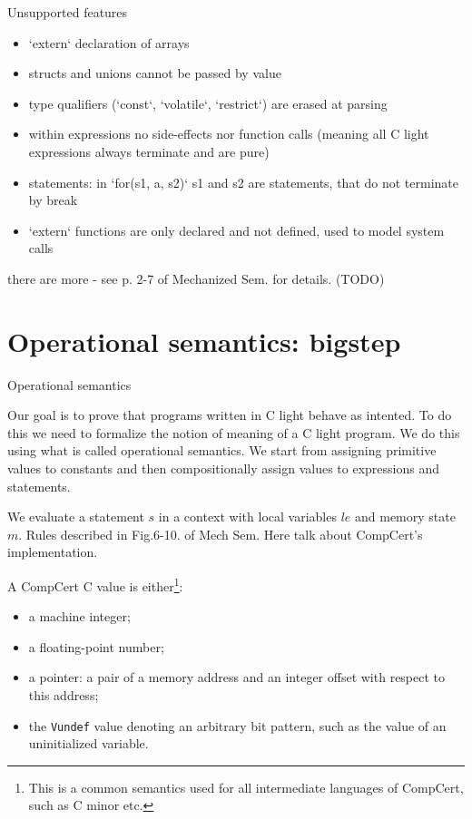 \documentclass{beamer}
\begin{document}
\begin{frame}{Unsupported features}
  \begin{itemize}
  \item `extern` declaration of arrays
\item structs and unions cannot be passed by value
\item  type qualifiers (`const`, `volatile`, `restrict`) are erased at parsing
\item within expressions no side-effects nor function calls (meaning all C light expressions always terminate and are pure)
\item statements: in `for(s1, a, s2)` s1 and s2 are statements, that do not terminate by break
\item `extern` functions are only declared and not defined, used to model system calls
\end{itemize}
there are more - see p. 2-7 of Mechanized Sem. for details. (TODO)
  
  \end{frame}


  \section{Operational semantics: bigstep}

  
  \begin{frame}{Operational semantics}

    Our goal is to prove that programs written in C light behave as intented. To do this we need to formalize the notion of meaning of a C light program. We do this using what is called operational semantics. We start from assigning primitive values to constants and then compositionally assign values to expressions and statements.

   \bigskip
We evaluate a statement $s$ in a context with local variables $le$ and memory state $m$. Rules described in Fig.6-10. of Mech Sem. Here talk about CompCert's implementation.
    \end{frame}

  \begin{frame}
    A CompCert C value is either\footnote{This is a common semantics used for all intermediate languages of CompCert, such as C minor etc.}:
    \begin{itemize}
    
\item a machine integer;
\item a floating-point number;
\item a pointer: a pair of a memory address and an integer offset with respect
  to this address;
\item the \texttt{Vundef} value denoting an arbitrary bit pattern, such as the
  value of an uninitialized variable.
 \end{itemize}
\end{frame}
\end{document}
